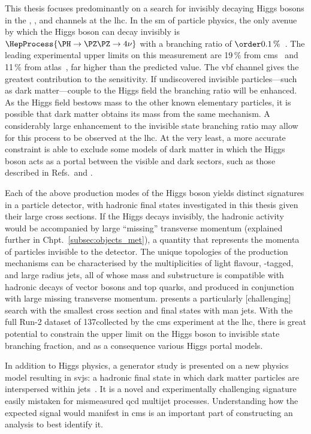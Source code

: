 This thesis focuses predominantly on a search for invisibly decaying Higgs bosons in the \ttH, \VH, and \ggH channels at the \acrshort{lhc}. In the \acrlong{sm} of particle physics, the only avenue by which the Higgs boson can decay invisibly is $\HepProcess{\PH \to \PZ\PZ \to \text{4}\nu}$ with a branching ratio of $\order{\text{0.1\,\%}}$~\cite{Heinemeyer:1559921}. The leading experimental upper limits on this measurement are 19\,\% from \acrshort{cms}~\cite{Sirunyan:2018owy} and 11\,\% from \acrshort{atlas}~\cite{ATLAS:2020kdi}, far higher than the predicted value. The \acrshort{vbf} channel gives the greatest contribution to the sensitivity. If undiscovered invisible particles---such as dark matter---couple to the Higgs field the branching ratio will be enhanced. As the Higgs field bestows mass to the other known elementary particles, it is possible that dark matter obtains its mass from the same mechanism. A considerably large enhancement to the invisible state branching ratio may allow for this process to be observed at the \acrshort{lhc}. At the very least, a more accurate constraint is able to exclude some models of dark matter in which the Higgs boson acts as a portal between the visible and dark sectors, such as those described in Refs.~and .

Each of the above production modes of the Higgs boson yields distinct signatures in a particle detector, with hadronic final states investigated in this thesis given their large cross sections. If the Higgs decays invisibly, the hadronic activity would be accompanied by large ``missing'' transverse momentum (explained further in Chpt.~\ref{subsec:objects_met}), a quantity that represents the momenta of particles invisible to the detector. The unique topologies of the production mechanisms can be characterised by the multiplicities of light flavour, \Pqb-tagged, and large radius \glspl{jet}, all of whose mass and substructure is compatible with hadronic decays of vector bosons and top quarks, and produced in conjunction with large missing transverse momentum. \ttH presents a particularly [challenging] search with the smallest cross section and final states with man \glspl{jet}. With the full Run-2 dataset of 137\fbinv collected by the \acrshort{cms} experiment at the \acrshort{lhc}, there is great potential to constrain the upper limit on the Higgs boson to invisible state branching fraction, and as a consequence various Higgs portal models.

In addition to Higgs physics, a generator study is presented on a new physics model resulting in \glspl{svj}: a hadronic final state in which dark matter particles are interspersed within \glspl{jet}~\cite{Cohen:2015toa,Cohen:2017pzm}. It is a novel and experimentally challenging signature easily mistaken for mismeasured \acrshort{qcd} multijet processes. Understanding how the expected signal would manifest in \acrshort{cms} is an important part of constructing an analysis to best identify it.

